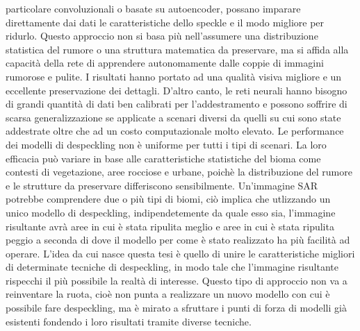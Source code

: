 particolare convoluzionali o basate su autoencoder, possano imparare direttamente dai dati le caratteristiche
dello speckle e il modo migliore per ridurlo. Questo approccio non si basa più nell'assumere una distribuzione 
statistica del rumore o una struttura matematica da preservare, ma si affida alla capacità della rete di 
apprendere autonomamente dalle coppie di immagini rumorose e pulite. I risultati hanno portato ad una qualità 
visiva migliore e un eccellente preservazione dei dettagli. D'altro canto, le reti neurali hanno bisogno 
di grandi quantità di dati ben calibrati per l'addestramento e possono soffrire di scarsa generalizzazione se 
applicate a scenari diversi da quelli su cui sono state addestrate oltre che ad un costo computazionale molto elevato. 
Le performance dei modelli di despeckling non è uniforme per tutti i tipi di scenari. La loro efficacia può variare
in base alle caratteristiche statistiche del bioma come contesti di vegetazione, aree rocciose e urbane, 
poichè la distribuzione del rumore e le strutture da preservare differiscono sensibilmente. Un'immagine SAR potrebbe 
comprendere due o più tipi di biomi, ciò implica che utlizzando un unico modello di despeckling, 
indipendetemente da quale esso sia, l'immagine risultante avrà aree in cui è stata ripulita meglio e aree in cui è 
stata ripulita peggio a seconda di dove il modello per come è stato realizzato ha più facilità ad operare.
L'idea da cui nasce questa tesi è quello di unire le caratteristiche migliori di determinate tecniche di despeckling, 
in modo tale che l'immagine risultante rispecchi il più possibile la realtà di interesse. Questo tipo di approccio non va a 
reinventare la ruota, cioè non punta a realizzare un nuovo modello con cui è possibile fare despeckling, ma è mirato
a sfruttare i punti di forza di modelli già esistenti fondendo i loro risultati tramite diverse tecniche. 